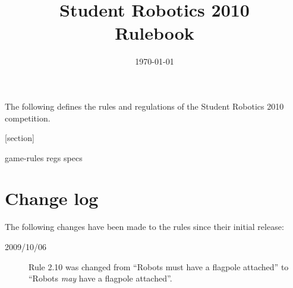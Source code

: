 \documentclass[a4paper, 12pt]{article}
\title {Student Robotics 2010\\ Rulebook}
\date{\today}
\begin{document}
\maketitle

\noindent The following defines the rules and regulations of the Student Robotics 2010 competition.

[section]
\newcommand{\rcn}{\stepcounter{rule}\arabic{section}.\arabic{rule}}
\renewcommand{\labelenumi}{\rcn}

 {game-rules}
\newpage
 {regs}
\newpage
 {specs}

\section{Change log}
The following changes have been made to the rules since their initial release:
\begin{description}
\item [2009/10/06] Rule 2.10 was changed from ``Robots must have a flagpole attached'' to ``Robots \emph{may} have a flagpole attached''.
\end{description}
\end{document}
